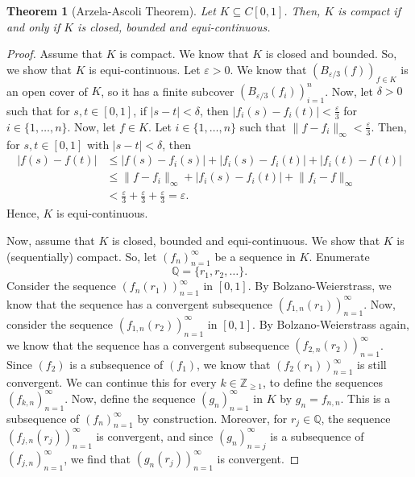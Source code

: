 \documentclass[a4paper, openany]{memoir}
\theoremstyle{definition}
\theoremstyle{plain}
\newtheorem{theorem}[definition]{Theorem}
\begin{document}
    \begin{theorem}[Arzela-Ascoli Theorem]
        Let $K \subseteq C[0, 1]$. Then, $K$ is compact if and only if $K$ is closed, bounded and equi-continuous.
    \end{theorem}
    \begin{proof}
        Assume that $K$ is compact. We know that $K$ is closed and bounded. So, we show that $K$ is equi-continuous. Let $\varepsilon > 0$. We know that $(B_{\varepsilon/3}(f))_{f \in K}$ is an open cover of $K$, so it has a finite subcover $(B_{\varepsilon/3}(f_i))_{i=1}^n$. Now, let $\delta > 0$ such that for $s, t \in [0, 1]$, if $|s - t| < \delta$, then $|f_i(s) - f_i(t)| < \frac{\varepsilon}{3}$ for $i \in \{1, \dots, n\}$. Now, let $f \in K$. Let $i \in \{1, \dots, n\}$ such that $\lVert f - f_i \rVert_\infty < \frac{\varepsilon}{3}$. Then, for $s, t \in [0, 1]$ with $|s - t| < \delta$, then
        \begin{align*}
            |f(s) - f(t)| &\leq |f(s) - f_i(s)| + |f_i(s) - f_i(t)| + |f_i(t) - f(t)| \\
            &\leq \lVert f - f_i \rVert_\infty + |f_i(s) - f_i(t)| + \lVert f_i - f \rVert_\infty \\
            &< \frac{\varepsilon}{3} + \frac{\varepsilon}{3} + \frac{\varepsilon}{3} = \varepsilon.
        \end{align*}
        Hence, $K$ is equi-continuous.

        Now, assume that $K$ is closed, bounded and equi-continuous. We show that $K$ is (sequentially) compact. So, let $(f_n)_{n=1}^\infty$ be a sequence in $K$. Enumerate 
        \[\mathbb{Q} = \{r_1, r_2, \dots\}.\]
        Consider the sequence $(f_n(r_1))_{n=1}^\infty$ in $[0, 1]$. By Bolzano-Weierstrass, we know that the sequence has a convergent subsequence $(f_{1, n}(r_1))_{n=1}^\infty$. Now, consider the sequence $(f_{1, n}(r_2))_{n=1}^\infty$ in $[0, 1]$. By Bolzano-Weierstrass again, we know that the sequence has a convergent subsequence $(f_{2, n}(r_2))_{n=1}^\infty$. Since $(f_2)$ is a subsequence of $(f_1)$, we know that $(f_2(r_1))_{n=1}^\infty$ is still convergent. We can continue this for every $k \in \mathbb{Z}_{\geq 1}$, to define the sequences $(f_{k, n})_{n=1}^\infty$. Now, define the sequence $(g_n)_{n=1}^\infty$ in $K$ by $g_n = f_{n, n}$. This is a subsequence of $(f_n)_{n=1}^\infty$ by construction. Moreover, for $r_j \in \mathbb{Q}$, the sequence $(f_{j, n}(r_j))_{n=1}^\infty$ is convergent, and since $(g_n)_{n=j}^\infty$ is a subsequence of $(f_{j, n})_{n=1}^\infty$, we find that $(g_n(r_j))_{n=1}^\infty$ is convergent. 


\end{proof}
\end{document}
